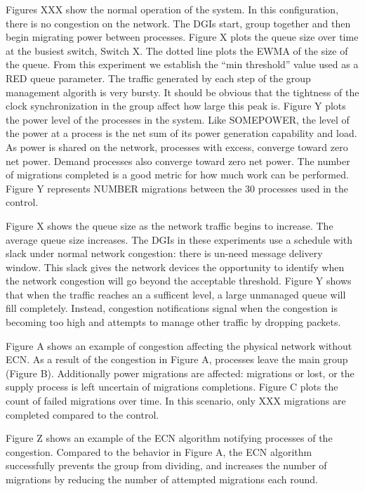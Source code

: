 Figures XXX show the normal operation of the system.
In this configuration, there is no congestion on the network. 
The DGIs start, group together and then begin migrating power between processes.
Figure X plots the queue size over time at the busiest switch, Switch X.
The dotted line plots the EWMA of the size of the queue.
From this experiment we establish the ``min threshold'' value used as a RED queue parameter.
The traffic generated by each step of the group management algorith is very bursty.
It should be obvious that the tightness of the clock synchronization in the group affect how large this peak is.
Figure Y plots the power level of the processes in the system.
Like SOMEPOWER, the level of the power at a process is the net sum of its power generation capability and load.
As power is shared on the network, processes with excess, converge toward zero net power.
Demand processes also converge toward zero net power.
The number of migrations completed is a good metric for how much work can be performed.
Figure Y represents NUMBER migrations between the 30 processes used in the control.

Figure X shows the queue size as the network traffic begins to increase.
The average queue size increases.
The DGIs in these experiments use a schedule with slack under normal network congestion: there is un-need message delivery window.
This slack gives the network devices the opportunity to identify when the network congestion will go beyond the acceptable threshold.
Figure Y shows that when the traffic reaches an a sufficent level, a large unmanaged queue will fill completely.
Instead, congestion notifications signal when the congestion is becoming too high and attempts to manage other traffic by dropping packets.

Figure A shows an example of congestion affecting the physical network without ECN.
As a result of the congestion in Figure A, processes leave the main group (Figure B).
Additionally power migrations are affected: migrations or lost, or the supply process is left uncertain of migrations completions.
Figure C plots the count of failed migrations over time.
In this scenario, only XXX migrations are completed compared to the control.

Figure Z shows an example of the ECN algorithm notifying processes of the congestion.
Compared to the behavior in Figure A, the ECN algorithm successfully prevents the group from dividing, and increases the number of migrations by reducing the number of attempted migrations each round.

